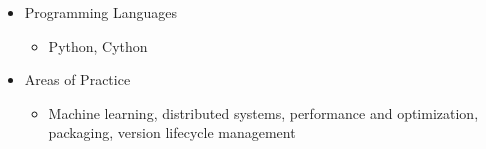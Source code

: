 \begin{itemize}
\tightlist
\item
  Programming Languages

  \begin{itemize}
  \tightlist
  \item
    Python, Cython
  \end{itemize}
\item
  Areas of Practice

  \begin{itemize}
  \tightlist
  \item
    Machine learning, distributed systems, performance and optimization,
    packaging, version lifecycle management
  \end{itemize}
\end{itemize}
